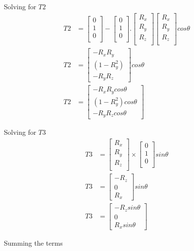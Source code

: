 \documentclass{article}
\newcommand{\yaxis}{
    \begin{bmatrix}
        0 \\
        1 \\
        0 \\
    \end{bmatrix}
}
\newcommand{\rotAxis}{
    \begin{bmatrix}
        R_x \\
        R_y \\
        R_z \\
    \end{bmatrix}
}
\newcommand{\vparallelForY}{
    \yaxis . \rotAxis 
    \rotAxis
}
\begin{document}
    Solving for $T2$
    \begin{align}
        T2 &= \yaxis - \vparallelForY cos\theta \\
        T2 &= \begin{bmatrix} -R_xR_y \\ (1-R_y^2) \\ -R_yR_z \end{bmatrix} cos\theta \\
        T2 &= \begin{bmatrix} -R_xR_ycos\theta \\ (1-R_y^2)cos\theta \\ -R_yR_zcos\theta \end{bmatrix}
    \end{align}

    Solving for $T3$
    \begin{align}
        T3 &= \rotAxis \times \yaxis sin\theta \\
        T3 &= \begin{bmatrix} -R_z \\ 0 \\ R_x \end{bmatrix}sin\theta\\
        T3 &= \begin{bmatrix} -R_zsin\theta \\ 0 \\ R_xsin\theta \end{bmatrix}
    \end{align}

    Summing the terms 
\end{document}
